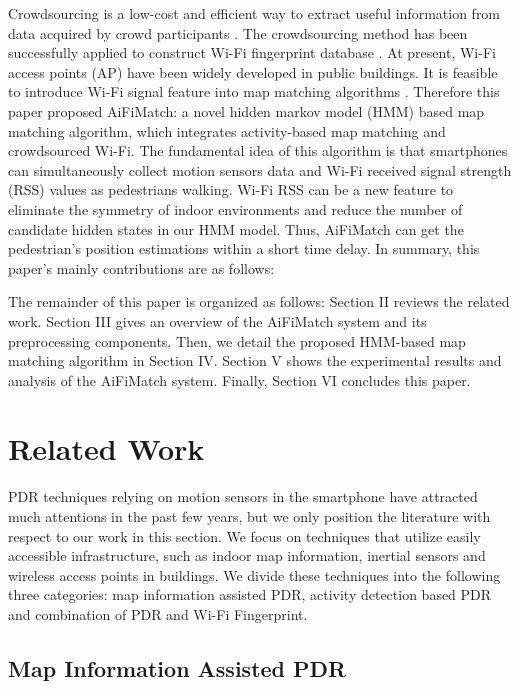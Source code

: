 \documentclass[conference]{IEEEtran}
\begin{document}
Crowdsourcing is a low-cost and efficient way to extract useful information from data acquired by crowd participants \cite{wang2016indoor}. The crowdsourcing method has been successfully applied to construct Wi-Fi fingerprint database \cite{zhang2014robust,xiang2017tack}. At present, Wi-Fi access points (AP) have been widely developed in public buildings. It is feasible to introduce Wi-Fi signal feature into map matching algorithms \cite{newson2009hidden, seitz2010hidden}. Therefore this paper proposed AiFiMatch: a novel hidden markov model (HMM) based map matching algorithm, which integrates activity-based map matching and crowdsourced Wi-Fi. The fundamental idea of this algorithm is that smartphones can simultaneously collect motion sensors data and Wi-Fi received signal strength (RSS) values as pedestrians walking. Wi-Fi RSS can be a new feature to eliminate the symmetry of indoor environments and reduce the number of candidate hidden states in our HMM model. Thus, AiFiMatch can get the pedestrian's position estimations within a short time delay.  In summary, this paper's mainly contributions are as follows:



The remainder of this paper is organized as follows: Section II reviews the related work. Section III gives an overview of the AiFiMatch system and its preprocessing components. Then, we detail the proposed HMM-based map matching algorithm in Section IV. Section V shows the experimental results and analysis of the AiFiMatch system. Finally, Section VI concludes this paper.

\section{Related Work}

PDR techniques relying on motion sensors in the smartphone have attracted much attentions in the past few years, but we only position the literature with respect to our work in this section.  We focus on techniques that utilize easily accessible infrastructure, such as indoor map information, inertial sensors and wireless access points in buildings. We divide these techniques into the following three categories: map information assisted PDR, activity detection based PDR and combination of PDR and Wi-Fi Fingerprint. 

\subsection{Map Information Assisted PDR}
\end{document}
